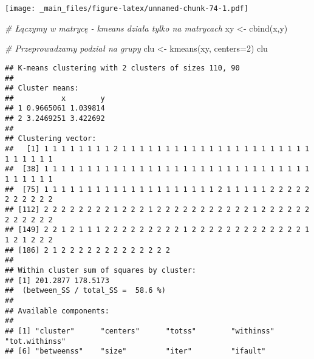 \documentclass[
]{book}
\newenvironment{Shaded}{\begin{snugshade}}{\end{snugshade}}
\newcommand{\AttributeTok}[1]{\textcolor[rgb]{0.77,0.63,0.00}{#1}}
\newcommand{\CommentTok}[1]{\textcolor[rgb]{0.56,0.35,0.01}{\textit{#1}}}
\newcommand{\DecValTok}[1]{\textcolor[rgb]{0.00,0.00,0.81}{#1}}
\newcommand{\FunctionTok}[1]{\textcolor[rgb]{0.00,0.00,0.00}{#1}}
\newcommand{\NormalTok}[1]{#1}
\newcommand{\OtherTok}[1]{\textcolor[rgb]{0.56,0.35,0.01}{#1}}
\newcommand{\SpecialCharTok}[1]{\textcolor[rgb]{0.00,0.00,0.00}{#1}}
\begin{document}
\texttt{[image: \_main\_files/figure-latex/unnamed-chunk-74-1.pdf]}

\begin{Shaded}
\begin{Highlighting}[]
\CommentTok{\# Łączymy w matrycę {-} kmeans działa tylko na matrycach}
\NormalTok{xy }\OtherTok{\textless{}{-}} \FunctionTok{cbind}\NormalTok{(x,y)}

\CommentTok{\# Przeprowadzamy podział na grupy}
\NormalTok{clu }\OtherTok{\textless{}{-}} \FunctionTok{kmeans}\NormalTok{(xy, }\AttributeTok{centers=}\DecValTok{2}\NormalTok{)}
\NormalTok{clu}
\end{Highlighting}
\end{Shaded}

\begin{verbatim}
## K-means clustering with 2 clusters of sizes 110, 90
## 
## Cluster means:
##           x        y
## 1 0.9665061 1.039814
## 2 3.2469251 3.422692
## 
## Clustering vector:
##   [1] 1 1 1 1 1 1 1 1 2 1 1 1 1 1 1 1 1 1 1 1 1 1 1 1 1 1 1 1 1 1 1 1 1 1 1 1 1
##  [38] 1 1 1 1 1 1 1 1 1 1 1 1 1 1 1 1 1 1 1 1 1 1 1 1 1 1 1 1 1 1 1 1 1 1 1 1 1
##  [75] 1 1 1 1 1 1 1 1 1 1 1 1 1 1 1 1 1 1 1 1 2 1 1 1 1 1 2 2 2 2 2 2 2 2 2 2 2
## [112] 2 2 2 2 2 2 2 2 1 2 2 2 1 2 2 2 2 2 2 2 2 2 2 2 1 2 2 2 2 2 2 2 2 2 2 2 2
## [149] 2 2 1 2 1 1 1 2 2 2 2 2 2 2 2 2 1 2 2 2 2 2 2 2 2 2 2 2 2 2 1 1 2 1 2 2 2
## [186] 2 1 2 2 2 2 2 2 2 2 2 2 2 2 2
## 
## Within cluster sum of squares by cluster:
## [1] 201.2877 178.5173
##  (between_SS / total_SS =  58.6 %)
## 
## Available components:
## 
## [1] "cluster"      "centers"      "totss"        "withinss"     "tot.withinss"
## [6] "betweenss"    "size"         "iter"         "ifault"
\end{verbatim}

\begin{Shaded}
\end{Shaded}
\end{document}
